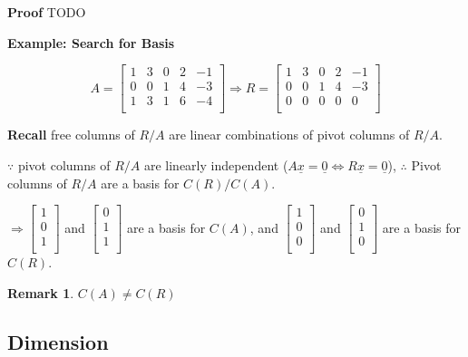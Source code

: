 \documentclass[12pt,a4paper]{article}
\newtheorem*{rem}{Remark}
\newcommand{\Remark}[1]{
  \begin{rem}
    \color{cyan}
    #1
  \end{rem}
}
\begin{document}
\textbf{Proof} TODO

\textbf{Example: Search for Basis}

\[
A = 
\begin{bmatrix}
  1 & 3 & 0 & 2 & -1 \\
  0 & 0 & 1 & 4 & -3 \\
  1 & 3 & 1 & 6 & -4 \\
\end{bmatrix} \Rightarrow
R = 
\begin{bmatrix}
  \boxed{1} & 3 & 0 & 2 & -1 \\
  0 & 0 & \boxed{1} & 4 & -3 \\
  0 & 0 & 0 & 0 & 0 \\
\end{bmatrix}
\]

\textbf{Recall} free columns of $R/A$ are linear combinations of pivot columns of $R/A$.

$\because$ pivot columns of $R/A$ are linearly independent ($A\underline{x} = \underline{0} \iff R\underline{x} = \underline{0}$),
$\therefore$ Pivot columns of $R/A$ are a basis for $C(R)/C(A)$.

$
\Rightarrow
\begin{bmatrix}
  1 \\
  0 \\
  1 \\
\end{bmatrix}
$ and 
$
\begin{bmatrix}
  0 \\
  1 \\
  1 \\
\end{bmatrix}
$ are a basis for $C(A)$, and
$
\begin{bmatrix}
  1 \\
  0 \\
  0 \\
\end{bmatrix}
$ and 
$
\begin{bmatrix}
  0 \\
  1 \\
  0 \\
\end{bmatrix}
$ are a basis for $C(R)$.

\Remark{$C(A) \neq C(R)$}

\subsection*{Dimension}
\end{document}
